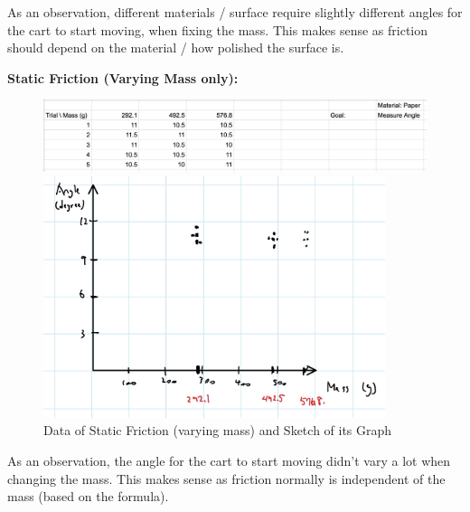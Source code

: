 \documentclass{article}
\begin{document}
\hfil

As an observation, different materials / surface require slightly different angles for the cart to start moving, when fixing the mass. This makes sense as friction should depend on the material / how polished the surface is. 

\pagebreak

\pagebreak

\textbf{Static Friction (Varying Mass only):}

\begin{figure}[h!]
    \centering
    \includegraphics[width=150mm]{static_mass_data.png}

    \hfil

    \includegraphics[width=100mm]{static_mass.jpg}
    \caption{Data of Static Friction (varying mass) and Sketch of its Graph}
\end{figure}

\hfil
As an observation, the angle for the cart to start moving didn't vary a lot when changing the mass. This makes sense as friction normally is independent of the mass (based on the formula).

\pagebreak

\pagebreak
\end{document}
